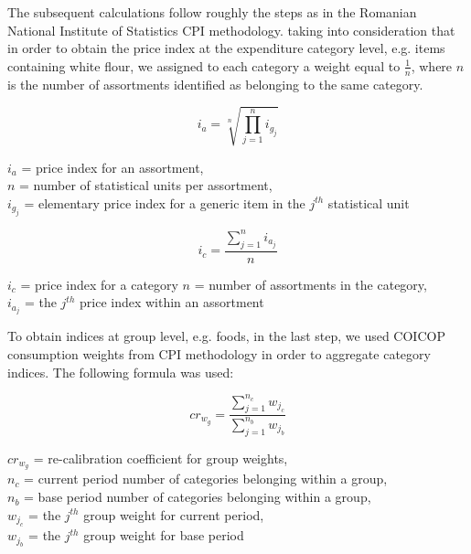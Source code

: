 \documentclass[]{article}
\begin{document}
The subsequent calculations follow roughly the steps as in the Romanian National Institute of Statistics CPI methodology\cite{cpi}. taking into consideration that in order to obtain the price index at the expenditure category level, e.g. items containing white flour, we assigned to each category a weight equal to $\frac{1}{n}$,
where $n$ is the number of assortments identified as belonging to the same category. 

\begin{equation}\label{eq:4}
i_{a} = \sqrt[n]{\prod_{j=1}^n i_{g_{j}}}
\end{equation}

\begin{center}
	$i_{a}$ = price index for an assortment, \\
	$n$ = number of statistical units per assortment, \\
	$i_{g_{j}}$ = elementary price index for a generic item in the $j^{th}$ statistical unit
\end{center}


\begin{equation}\label{eq:5}
i_{c} = \frac{\sum_{j=1}^n i_{a_{j}}}{n}
\end{equation}

\begin{center}
	$i_{c}$ = price index for a category
	$n$ = number of assortments in the category, \\
	$i_{a_{j}}$ = the $j^{th}$ price index within an assortment
\end{center}

To obtain indices at group level, e.g. foods, in the last step, we used COICOP consumption weights from CPI methodology in order to aggregate category indices.  The following formula was used:


\begin{equation}\label{eq:6}
cr_{w_{g}} = \frac{\sum_{j=1}^{n_{c}}{w_{j_{c}}}}{\sum_{j=1}^{n_{b}}{w_{j_{b}}}}
\end{equation}

\begin{center}
	$cr_{w_{g}}$ = re-calibration coefficient for group weights, \\
	$n_{c}$ = current period number of categories belonging within a group, \\
	$n_{b}$ = base period number of categories belonging within a group, \\
	$w_{j_{c}}$ = the $j^{th}$ group weight for current period, \\
	$w_{j_{b}}$ = the $j^{th}$ group weight for base period
	
\end{center}
\end{document}
